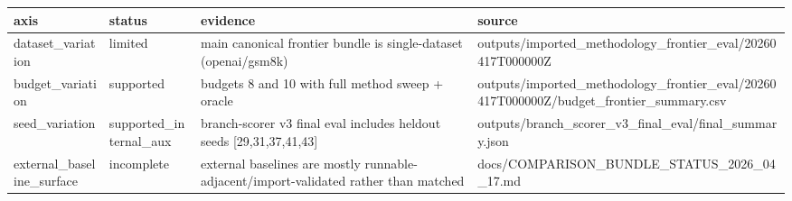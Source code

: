 \begin{tabular}{llll}
\hline
axis & status & evidence & source \\
\hline
dataset_variation & limited & main canonical frontier bundle is single-dataset (openai/gsm8k) & outputs/imported_methodology_frontier_eval/20260417T000000Z \\
budget_variation & supported & budgets 8 and 10 with full method sweep + oracle & outputs/imported_methodology_frontier_eval/20260417T000000Z/budget_frontier_summary.csv \\
seed_variation & supported_internal_aux & branch-scorer v3 final eval includes heldout seeds [29,31,37,41,43] & outputs/branch_scorer_v3_final_eval/final_summary.json \\
external_baseline_surface & incomplete & external baselines are mostly runnable-adjacent/import-validated rather than matched & docs/COMPARISON_BUNDLE_STATUS_2026_04_17.md \\
\hline
\end{tabular}
